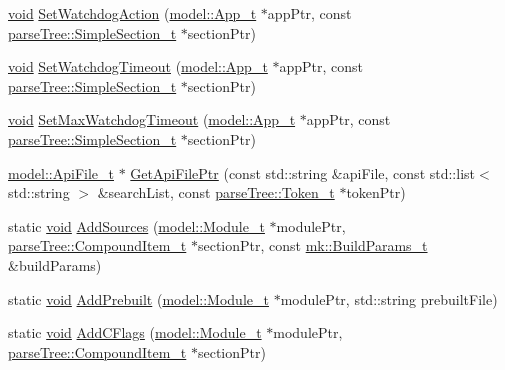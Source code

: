 \begin{DoxyCompactItemize}
\item 
\hyperlink{_t_e_m_p_l_a_t_e__cdef_8h_ac9c84fa68bbad002983e35ce3663c686}{void} \hyperlink{namespacemodeller_a469a0a7a2d8393da258d4b1c9d6b7240}{Set\+Watchdog\+Action} (\hyperlink{structmodel_1_1_app__t}{model\+::\+App\+\_\+t} $\ast$app\+Ptr, const \hyperlink{structparse_tree_1_1_simple_section__t}{parse\+Tree\+::\+Simple\+Section\+\_\+t} $\ast$section\+Ptr)
\item 
\hyperlink{_t_e_m_p_l_a_t_e__cdef_8h_ac9c84fa68bbad002983e35ce3663c686}{void} \hyperlink{namespacemodeller_aa662090406104ae31052c3eeb17ce8f2}{Set\+Watchdog\+Timeout} (\hyperlink{structmodel_1_1_app__t}{model\+::\+App\+\_\+t} $\ast$app\+Ptr, const \hyperlink{structparse_tree_1_1_simple_section__t}{parse\+Tree\+::\+Simple\+Section\+\_\+t} $\ast$section\+Ptr)
\item 
\hyperlink{_t_e_m_p_l_a_t_e__cdef_8h_ac9c84fa68bbad002983e35ce3663c686}{void} \hyperlink{namespacemodeller_add0ee68a65392c1fce7f2c711dc6b477}{Set\+Max\+Watchdog\+Timeout} (\hyperlink{structmodel_1_1_app__t}{model\+::\+App\+\_\+t} $\ast$app\+Ptr, const \hyperlink{structparse_tree_1_1_simple_section__t}{parse\+Tree\+::\+Simple\+Section\+\_\+t} $\ast$section\+Ptr)
\item 
\hyperlink{structmodel_1_1_api_file__t}{model\+::\+Api\+File\+\_\+t} $\ast$ \hyperlink{namespacemodeller_aedece860d6d4e01281ccc876a8f79632}{Get\+Api\+File\+Ptr} (const std\+::string \&api\+File, const std\+::list$<$ std\+::string $>$ \&search\+List, const \hyperlink{structparse_tree_1_1_token__t}{parse\+Tree\+::\+Token\+\_\+t} $\ast$token\+Ptr)
\item 
static \hyperlink{_t_e_m_p_l_a_t_e__cdef_8h_ac9c84fa68bbad002983e35ce3663c686}{void} \hyperlink{namespacemodeller_af93f67c650f41e711b1d6d01a1dcd002}{Add\+Sources} (\hyperlink{structmodel_1_1_module__t}{model\+::\+Module\+\_\+t} $\ast$module\+Ptr, \hyperlink{structparse_tree_1_1_compound_item__t}{parse\+Tree\+::\+Compound\+Item\+\_\+t} $\ast$section\+Ptr, const \hyperlink{structmk_1_1_build_params__t}{mk\+::\+Build\+Params\+\_\+t} \&build\+Params)
\item 
static \hyperlink{_t_e_m_p_l_a_t_e__cdef_8h_ac9c84fa68bbad002983e35ce3663c686}{void} \hyperlink{namespacemodeller_a39623841426cdf347a269ab09a394b84}{Add\+Prebuilt} (\hyperlink{structmodel_1_1_module__t}{model\+::\+Module\+\_\+t} $\ast$module\+Ptr, std\+::string prebuilt\+File)
\item 
static \hyperlink{_t_e_m_p_l_a_t_e__cdef_8h_ac9c84fa68bbad002983e35ce3663c686}{void} \hyperlink{namespacemodeller_a4bdb31dc81a74cbfe049e1919543adb6}{Add\+C\+Flags} (\hyperlink{structmodel_1_1_module__t}{model\+::\+Module\+\_\+t} $\ast$module\+Ptr, \hyperlink{structparse_tree_1_1_compound_item__t}{parse\+Tree\+::\+Compound\+Item\+\_\+t} $\ast$section\+Ptr)

\end{DoxyCompactItemize}
